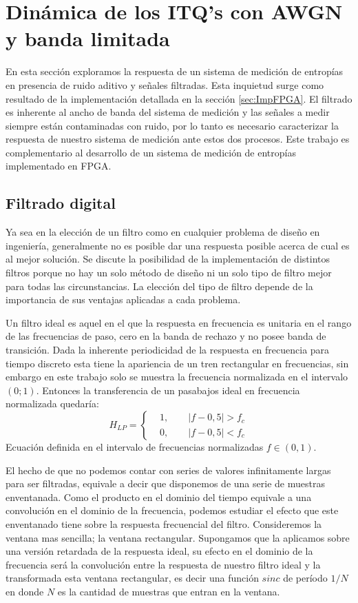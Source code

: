 \section{Dinámica de los ITQ's con AWGN y banda limitada}

En esta sección exploramos la respuesta de un sistema de medición de entropías en presencia de ruido aditivo y señales filtradas.
Esta inquietud surge como resultado de la implementación detallada en la sección \ref{sec:ImpFPGA}.
El filtrado es inherente al ancho de banda del sistema de medición y las señales a medir siempre están contaminadas con ruido, por lo tanto es necesario caracterizar la respuesta de nuestro sistema de medición ante estos dos procesos.
Este trabajo es complementario al desarrollo de un sistema de medición de entropías implementado en FPGA.

\subsection{Filtrado digital}
\label{sec:filtrado}

Ya sea en la elección de un filtro como en cualquier problema de diseño en ingeniería, generalmente no es posible dar una respuesta posible acerca de cual es al mejor solución. Se discute la posibilidad de la implementación de distintos filtros porque no hay un solo método de diseño ni un solo tipo de filtro mejor para todas las circunstancias. La elección del tipo de filtro depende de la importancia de sus ventajas aplicadas a cada problema.

Un filtro ideal es aquel en el que la respuesta en frecuencia es unitaria en el rango de las frecuencias de paso, cero en la banda de rechazo y no posee banda de transición. Dada la inherente periodicidad de la respuesta en frecuencia para tiempo discreto esta tiene la apariencia de un tren rectangular en frecuencias, sin embargo en este trabajo solo se muestra la frecuencia normalizada en el intervalo $(0;1)$. Entonces la transferencia de un pasabajos ideal en frecuencia normalizada quedaría:
\begin{equation}
H_{LP}=
\left\{ 
\begin{aligned}
&1,\qquad|f-0,5|>f_c\\
&0,\qquad|f-0,5|<f_c
\end{aligned}
\right.
\end{equation}
Ecuación definida en el intervalo de frecuencias normalizadas $f\in\left(0,1\right)$.

El hecho de que no podemos contar con series de valores infinitamente largas para ser filtradas, equivale a decir que disponemos de una serie de muestras enventanada.
Como el producto en el dominio del tiempo equivale a una convolución en el dominio de la frecuencia, podemos estudiar el efecto que este enventanado tiene sobre la respuesta frecuencial del filtro.
Consideremos la ventana mas sencilla; la ventana rectangular. Supongamos que la aplicamos sobre una versión retardada de la respuesta ideal, su efecto en el dominio de la frecuencia será la convolución entre la respuesta de nuestro filtro ideal y la transformada esta ventana rectangular, es decir una función $sinc$ de período $1/N$ en donde $N$ es la cantidad de muestras que entran en la ventana.

